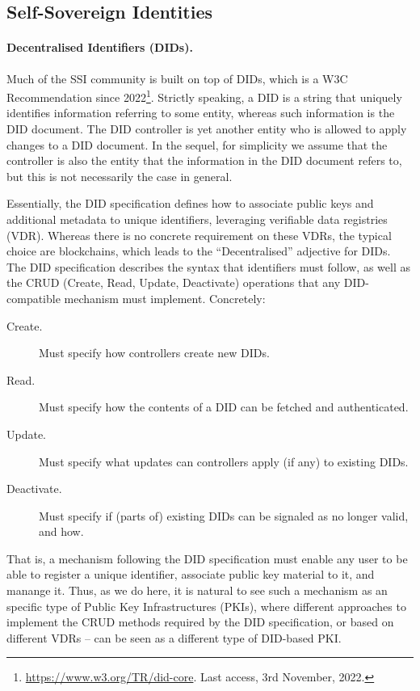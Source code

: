 \subsection{Self-Sovereign Identities}
\label{ssec:ssi}

\paragraph{Decentralised Identifiers (DIDs).} %
Much of the SSI community is built on top of DIDs, which is a W3C Recommendation
since 2022\footnote{\url{https://www.w3.org/TR/did-core}. Last access, 3rd
  November, 2022.}. Strictly speaking, a DID is a string that uniquely
identifies information referring to some entity, whereas such information is
the DID document. The DID controller is yet another entity who is allowed to
apply changes to a DID document. In the sequel, for simplicity we assume that
the controller is also the entity that the information in the DID document
refers to, but this is not necessarily the case in general.

Essentially, the DID specification defines how to associate
public keys and additional metadata to unique identifiers, leveraging verifiable
data registries (VDR). Whereas there is no concrete requirement on these VDRs,
the typical choice are blockchains, which leads to the ``Decentralised''
adjective for DIDs. The DID specification describes the syntax that identifiers
must follow, as well as the CRUD (Create, Read, Update, Deactivate) operations
that any DID-compatible mechanism must implement. Concretely:

\begin{description}
\item[Create.] Must specify how controllers create new DIDs.
\item[Read.] Must specify how the contents of a DID can be fetched and
  authenticated.
\item[Update.] Must specify what updates can controllers apply (if any)
  to existing DIDs.
\item[Deactivate.] Must specify if (parts of) existing DIDs can be signaled
  as no longer valid, and how.
\end{description}

That is, a mechanism following the DID specification must enable any user to be
able to register a unique identifier, associate public key material to it, and
manange it. Thus, as we do here, it is natural to see such a mechanism as an
specific type of Public Key Infrastructures (PKIs), where different
approaches to implement the CRUD methods required by the DID specification, or
based on different VDRs -- can be seen as a different type of DID-based PKI.

